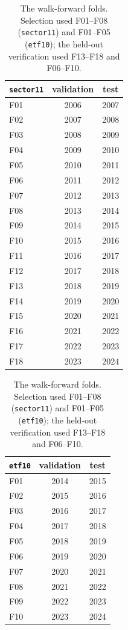 \begin{table}[t]
  \centering
  \small
  \begin{minipage}[t]{0.48\textwidth}
    \centering
    \begin{tabular}{lcc}
      \hline
      \texttt{sector11} & validation & test \\
      \hline
      F01 & 2006 & 2007 \\
      F02 & 2007 & 2008 \\
      F03 & 2008 & 2009 \\
      F04 & 2009 & 2010 \\
      F05 & 2010 & 2011 \\
      F06 & 2011 & 2012 \\
      F07 & 2012 & 2013 \\
      F08 & 2013 & 2014 \\
      F09 & 2014 & 2015 \\
      F10 & 2015 & 2016 \\
      F11 & 2016 & 2017 \\
      F12 & 2017 & 2018 \\
      F13 & 2018 & 2019 \\
      F14 & 2019 & 2020 \\
      F15 & 2020 & 2021 \\
      F16 & 2021 & 2022 \\
      F17 & 2022 & 2023 \\
      F18 & 2023 & 2024 \\
      \hline
    \end{tabular}
  \end{minipage}
  \hfill
  \begin{minipage}[t]{0.48\textwidth}
    \centering
    \begin{tabular}{lcc}
      \hline
      \texttt{etf10} & validation & test \\
      \hline
      F01 & 2014 & 2015 \\
      F02 & 2015 & 2016 \\
      F03 & 2016 & 2017 \\
      F04 & 2017 & 2018 \\
      F05 & 2018 & 2019 \\
      F06 & 2019 & 2020 \\
      F07 & 2020 & 2021 \\
      F08 & 2021 & 2022 \\
      F09 & 2022 & 2023 \\
      F10 & 2023 & 2024 \\
      \hline
    \end{tabular}
  \end{minipage}
  \caption[Fold definitions]{The walk-forward folds. Selection used
  F01--F08 (\texttt{sector11}) and F01--F05 (\texttt{etf10}); the held-out
  verification used F13--F18 and F06--F10.}
  \label{tab:app-folds}
\end{table}

